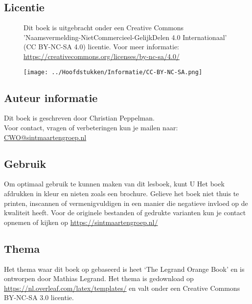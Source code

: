\subsection*{Licentie}
\begin{figure}[H]
	\centering
	\begin{minipage}[t]{0.60\textwidth}
		\vspace{-1.80cm}
		Dit boek is uitgebracht onder een Creative Commons
		'Naamsvermelding-NietCommercieel-GelijkDelen 4.0 Internationaal' (CC BY-NC-SA 4.0) licentie. Voor meer informatie: \url{https://creativecommons.org/licenses/by-nc-sa/4.0/}
	\end{minipage}
	\hfill
	\begin{minipage}[b]{0.35\textwidth}
	\texttt{[image: ../Hoofdstukken/Informatie/CC-BY-NC-SA.png]}
\end{minipage}
\end{figure}
\subsection*{Auteur informatie}
Dit boek is geschreven door Christian Peppelman.\\ 
Voor contact, vragen of verbeteringen kun je mailen naar: \href{mailto:cwo@sintmaartengroep.nl}{CWO@sintmaartengroep.nl} 
\subsection*{Gebruik}
Om optimaal gebruik te kunnen maken van dit lesboek, kunt U Het boek afdrukken in kleur en nieten zoals een brochure. Gelieve het boek niet thuis te printen, inscannen of vermenigvuldigen in een manier die negatieve invloed op de kwaliteit heeft. Voor de originele bestanden of gedrukte varianten kun je contact opnemen of kijken op \url{https://sintmaartengroep.nl/}
\subsection*{Thema}
Het thema waar dit boek op gebaseerd is heet `The Legrand Orange Book' en is ontworpen door Mathias Legrand. Het thema is gedownload op \url{https://nl.overleaf.com/latex/templates/} en valt onder een Creative Commons BY-NC-SA 3.0 licentie.
